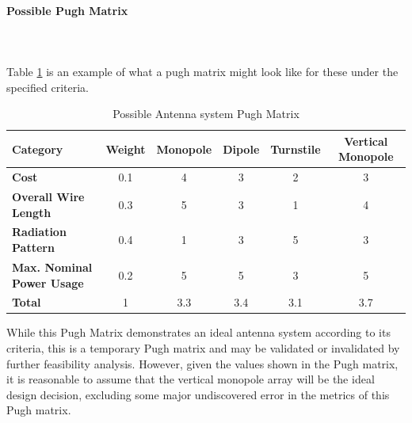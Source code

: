 \paragraph{Possible Pugh Matrix} ~\\ ~\\
Table \ref{tbl:antenna_pugh} is an example of what a pugh matrix might look like for these under the specified criteria.

\begin{table}[H]
\centering
\begin{tabular}{|l|c|c|c|c|c|} 
\hline
    \textbf{Category} & \textbf{Weight} & \textbf{Monopole} & \textbf{Dipole}& \textbf{Turnstile} & \textbf{Vertical Monopole}
    \\
\hline
    \textbf{Cost} & 0.1 & 4 & 3 & 2 & 3
    \\
\hline
    \textbf{Overall Wire Length}& 0.3 & 5 & 3 & 1 & 4
    \\
\hline
    \textbf{Radiation Pattern} & 0.4 & 1 & 3 & 5 & 3
    \\
\hline
    \textbf{Max. Nominal Power Usage}& 0.2 & 5 & 5 & 3 & 5 
    \\
\hline
    \textbf{Total} & 1 & 3.3 & 3.4 & 3.1 & 3.7
    \\
\hline
\end{tabular}
\caption{Possible Antenna system Pugh Matrix }
\label{tbl:antenna_pugh}
\end{table}

While this Pugh Matrix demonstrates an ideal antenna system according to its criteria, this is a temporary Pugh matrix and may be validated or invalidated by further feasibility analysis. However, given the values shown in the Pugh matrix, it is reasonable to assume that the vertical monopole array will be the ideal design decision, excluding some major undiscovered error in the metrics of this Pugh matrix.